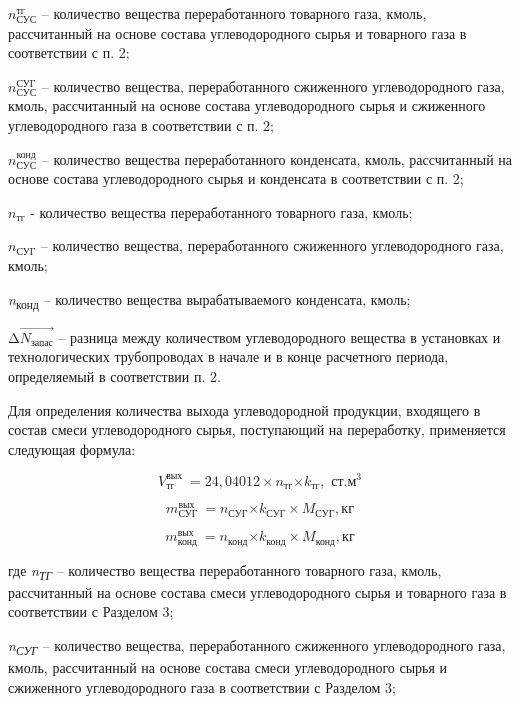 \begin{multicols}{2}
\(n_{\text{СУС}}^{\text{тг}}\) -- количество вещества переработанного товарного газа,
кмоль, рассчитанный на основе состава углеводородного сырья и товарного
газа в соответствии с п. 2;

\(n_{\text{СУС}}^{\text{СУГ}}\) -- количество вещества, переработанного сжиженного
углеводородного газа, кмоль, рассчитанный на основе состава
углеводородного сырья и сжиженного углеводородного газа в соответствии с
п. 2;

\(n_{\text{СУС}}^{\text{конд}}\) -- количество вещества переработанного конденсата,
кмоль, рассчитанный на основе состава углеводородного сырья и конденсата
в соответствии с п. 2;

\(n_{\text{тг}}\) - количество вещества переработанного
товарного газа, кмоль;

\(n_{\text{СУГ}}\) -- количество вещества, переработанного
сжиженного углеводородного газа, кмоль;

\emph{n}\textsubscript{конд} -- количество вещества вырабатываемого
конденсата, кмоль;

\(\mathrm{\Delta}\overrightarrow{Ν_{\text{запас}}}\) -- разница между
количеством углеводородного вещества в установках и технологических
трубопроводах в начале и в конце расчетного периода, определяемый в
соответствии п. 2.

Для определения количества выхода углеводородной продукции, входящего в
состав смеси углеводородного сырья, поступающий на переработку,
применяется следующая формула:

\begin{equation}
V_{\text{тг}}^{\text{вых}}\  = 24,04012 \times n_{\text{тг}}{\times k}_{\text{тг}},\text{ ст.м}^3
\end{equation}

\begin{equation}
m_{\text{СУГ}}^{\text{вых}}\  = n_{\text{СУГ}}{\times k}_{\text{СУГ}} \times M_{\text{СУГ}}, \text{кг}
\end{equation}

\begin{equation}
m_{\text{конд}}^{\text{вых}}\  = n_{\text{конд}}{\times k}_{\text{конд}} \times M_{\text{конд}}, \text{кг}
\end{equation}

где \emph{n\textsubscript{ТГ}} -- количество вещества переработанного
товарного газа, кмоль, рассчитанный на основе состава смеси
углеводородного сырья и товарного газа в соответствии с Разделом 3;

\emph{n\textsubscript{СУГ}} -- количество вещества, переработанного
сжиженного углеводородного газа, кмоль, рассчитанный на основе состава
смеси углеводородного сырья и сжиженного углеводородного газа в
соответствии с Разделом 3;


\end{multicols}
